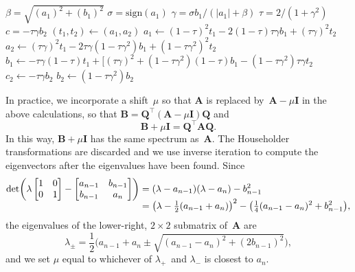\documentclass[12pt,a4paper]{article}
\newcommand{\bs}[1]{\boldsymbol{#1}}
\newcommand{\sign}{\mathrm{sign}}
\begin{document}
\begin{algorithm}
\begin{algorithmic}
\Function{implicit\_Q\_step}{$\bs{a}$, $\bs{b}$} 
\State $\beta=\sqrt{(a_1)^2+(b_1)^2}$
\State $\sigma=\sign(a_1)$
\State $\gamma=\sigma b_1/(|a_1|+\beta)$
\State $\tau=2/(1+\gamma^2)$
\State $c=-\tau\gamma b_2$
\State $(t_1,t_2)\gets(a_1,a_2)$
\State $a_1\gets(1-\tau)^2t_1-2(1-\tau)\tau\gamma b_1+(\tau\gamma)^2t_2$
\State $a_2\gets(\tau\gamma)^2t_1-2\tau\gamma(1-\tau\gamma^2)b_1
+(1-\tau\gamma^2)^2t_2$
\State $b_1\gets-\tau\gamma(1-\tau)t_1
+[(\tau\gamma)^2+(1-\tau\gamma^2)(1-\tau)b_1-(1-\tau\gamma^2)\tau\gamma t_2$
\State $c_2\gets-\tau\gamma b_2$
\State $b_2\gets(1-\tau\gamma^2)b_2$
\EndFor
\EndFunction
\end{algorithmic}
\end{algorithm}

In practice, we incorporate a shift~$\mu$ so that $\bs{A}$ is replaced
by~$\bs{A}-\mu\bs{I}$ in the above calculations, so that 
$\bs{B}=\bs{Q}^\top(\bs{A}-\mu\bs{I})\bs{Q}$ and
\[
\bs{B}+\mu\bs{I}=\bs{Q}^\top\bs{A}\bs{Q}.
\]
In this way, $\bs{B}+\mu\bs{I}$ has the same spectrum as~$\bs{A}$.  The 
Householder transformations are discarded and we use inverse iteration to 
compute the eigenvectors after the eigenvalues have been found. Since
\begin{align*}
\smash[b]{\det\biggl(\lambda\begin{bmatrix}1&0\\ 0&1\end{bmatrix}
    -\begin{bmatrix}a_{n-1}&b_{n-1}\\ b_{n-1}&a_n \end{bmatrix}\biggr)}
&=(\lambda-a_{n-1})(\lambda-a_n)-b_{n-1}^2\\
&=\bigl(\lambda-\tfrac12(a_{n-1}+a_n)\bigr)^2
    -\bigl(\tfrac14(a_{n-1}-a_n)^2+b_{n-1}^2\bigr),
\end{align*}
the eigenvalues of the lower-right, $2\times2$ submatrix of~$\bs{A}$ are
\begin{equation}\label{eq: 2x2 eigs}
\lambda_\pm=\frac{1}{2}\bigl(a_{n-1}+a_n\pm\sqrt{(a_{n-1}-a_n)^2+(2b_{n-1})^2}
\bigr),
\end{equation}
and we set $\mu$ equal to whichever of $\lambda_+$~and $\lambda_-$ is closest
to $a_n$.  










\end{document}
